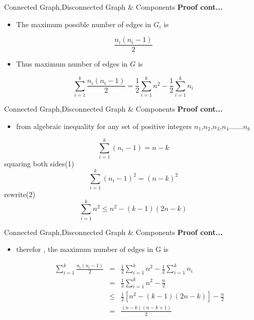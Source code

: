 \documentclass{beamer}
\begin{document}
\begin{frame}{Connected Graph,Disconnected Graph \& Components}
	\textbf{Proof cont...}
	\begin{itemize}
		\item The maximum possible number of edges in $G_i$ is
	\end{itemize}
$$\frac{n_i(n_i-1)}{2}$$
\begin{itemize}
	\item Thus maximum number of edges in $G$ is
\end{itemize}
$$\sum_{i=1}^{k}{\frac{n_i(n_i-1)}{2}}=\frac{1}{2}\sum_{i=1}^{k}{n^2}-\frac{1}{2}\sum_{i=1}^{k}{n_i}$$
\end{frame}
\begin{frame}{Connected Graph,Disconnected Graph \& Components}
	\textbf{Proof cont...}
	\begin{itemize}
		\item from algebraic inequality for any set of positive integers $n_1$,$n_2$,$n_3$,$n_4$.......$n_k$
	\end{itemize}
\setcounter{equation}{0}
\begin{equation} 
\sum_{i=1}^{k}{(n_i-1)}= n-k
\end{equation}
squaring both sides(1)
\begin{equation}
	\sum_{i=1}^{k}{(n_i-1)^2}= (n-k)^2
\end{equation}
rewrite(2)
\begin{equation}
	\sum_{i=1}^{k}{n^2}\leq n^2-(k-1)(2n-k)
\end{equation}
\end{frame}

\begin{frame}{Connected Graph,Disconnected Graph \& Components}
	\textbf{Proof cont...}
	\begin{itemize}
		\item  therefor , the maximum number of edges in G is
		\begin{small}
			\begin{eqnarray*}
				\sum_{i=1}^{k}{\frac{n_i(n_i-1)}{2}}&=&\frac{1}{2}\sum_{i=1}^{k}{n^2}-\frac{1}{2}\sum_{i=1}^{k}{n_i}\\
				&=&\frac{1}{2}\sum_{i=1}^{k}{n^2}-\frac{n}{2}\\
				&\leq&\frac{1}{2}[n^2-(k-1)(2n-k)]-\frac{n}{2}\\
				&=&\frac{(n-k)(n-k+1)}{2}\\
			\end{eqnarray*}
		\end{small}
	\end{itemize}
\end{frame}
\end{document}
